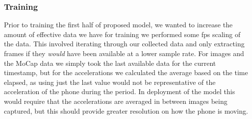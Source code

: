 


\subsubsection{Training}\nl
Prior to training the first half of proposed model, we wanted to increase the amount of effective data we have for training we performed some fps scaling of the data. 
This involved iterating through our collected data and only extracting frames if they \textit{would} have been available at a lower sample rate. For images and the MoCap data we simply took the last available data for the current timestamp, but for the accelerations we calculated the average based on the time elapsed, as using just the last value would not be representative of the acceleration of the phone during the period.
In deployment of the model this would require that the accelerations are averaged in between images being captured, but this should provide greater resolution on how the phone is moving.\\
\\

